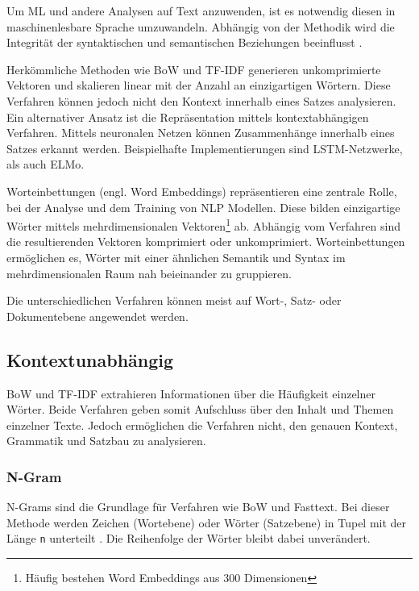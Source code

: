 Um \ac{ML} und andere Analysen auf Text anzuwenden, ist es notwendig diesen in maschinenlesbare Sprache umzuwandeln. Abhängig von der Methodik wird die Integrität der syntaktischen und semantischen Beziehungen beeinflusst \autocite{kowsari_text_2019, jurafsky_speech_2023}.

Herkömmliche Methoden wie \ac{BoW} und \ac{TF-IDF} generieren unkomprimierte Vektoren und skalieren linear mit der Anzahl an einzigartigen Wörtern. Diese Verfahren können jedoch nicht den Kontext innerhalb eines Satzes analysieren. Ein alternativer Ansatz ist die Repräsentation mittels kontextabhängigen Verfahren. Mittels neuronalen Netzen können Zusammenhänge innerhalb eines Satzes erkannt werden. Beispielhafte Implementierungen sind \ac{LSTM}-Netzwerke, als auch \ac{ELMo}.


Worteinbettungen (engl. Word Embeddings) repräsentieren eine zentrale Rolle, bei der Analyse und dem Training von \ac{NLP} Modellen. Diese bilden einzigartige Wörter mittels mehrdimensionalen Vektoren\footnote{Häufig bestehen Word Embeddings aus \num{300} Dimensionen} ab. Abhängig vom Verfahren sind die resultierenden Vektoren komprimiert oder unkomprimiert. Worteinbettungen ermöglichen es, Wörter mit einer ähnlichen Semantik und Syntax im mehrdimensionalen Raum nah beieinander zu gruppieren.

Die unterschiedlichen Verfahren können meist auf Wort-, Satz- oder Dokumentebene angewendet werden.

\subsection{Kontextunabhängig}

\ac{BoW} und \ac{TF-IDF} extrahieren Informationen über die Häufigkeit einzelner Wörter. Beide Verfahren geben somit Aufschluss über den Inhalt und Themen einzelner Texte. Jedoch ermöglichen die Verfahren nicht, den genauen Kontext, Grammatik und Satzbau zu analysieren. 


\subsubsection*{N-Gram}

N-Grams sind die Grundlage für Verfahren wie \ac{BoW} und Fasttext. Bei dieser Methode werden Zeichen (Wortebene) oder Wörter (Satzebene) in Tupel mit der Länge \texttt{n} unterteilt \autocite[5]{kowsari_text_2019}. Die Reihenfolge der Wörter bleibt dabei unverändert. 

